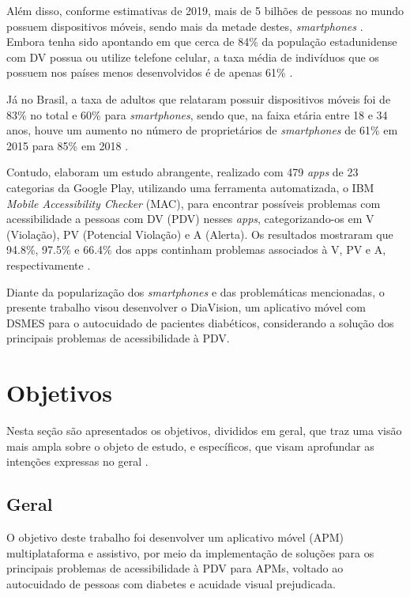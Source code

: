 Além disso, conforme estimativas de 2019, mais de 5 bilhões de pessoas no mundo possuem dispositivos móveis, sendo mais da metade destes, \textit{smartphones}
\cite{Taylor2019}. Embora tenha sido apontando em  que cerca de 84\% da população estadunidense com DV possua ou utilize
telefone celular, a taxa média de indivíduos que os possuem nos países menos desenvolvidos é de apenas 61\% \cite{ITU_2021}.

Já no Brasil, a taxa de adultos que relataram possuir dispositivos móveis foi de 83\% no total e 60\% para \textit{smartphones},
sendo que, na faixa etária entre 18 e 34 anos, houve um aumento no número de proprietários de \textit{smartphones} de
61\% em 2015 para 85\% em 2018 \cite{Taylor2019}.

Contudo,  elaboram um estudo abrangente, realizado com 479 \textit{apps} de 23 categorias da
Google Play, utilizando uma ferramenta automatizada, o IBM \textit{Mobile Accessibility Checker}
(MAC), para encontrar possíveis problemas com acessibilidade a pessoas com DV (PDV) nesses \textit{apps},
categorizando-os em V (Violação), PV (Potencial Violação) e A (Alerta). Os resultados mostraram que 94.8\%, 97.5\% e 66.4\% dos apps continham problemas
associados à V, PV e A, respectivamente \cite{Yan2019}.

Diante da popularização dos \emph{smartphones} e das problemáticas mencionadas, o presente trabalho visou desenvolver o DiaVision, um aplicativo móvel
com DSMES para o autocuidado de pacientes diabéticos, considerando a solução dos principais problemas de acessibilidade à PDV\@.

\section{Objetivos}

Nesta seção são apresentados os objetivos, divididos em geral, que traz uma visão mais ampla sobre o objeto
de estudo, e específicos, que visam aprofundar as intenções expressas no geral \cite{cervo2006metodologia}.

\subsection{Geral}

O objetivo deste trabalho foi desenvolver um aplicativo móvel (APM) multiplataforma e assistivo, por meio da implementação de soluções para os principais
problemas de acessibilidade à PDV para APMs, voltado ao autocuidado de pessoas com diabetes e acuidade visual prejudicada.

